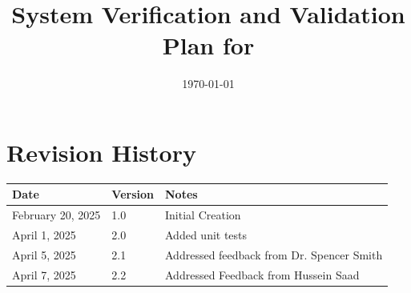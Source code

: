 \documentclass[12pt, titlepage]{article}
\begin{document}
\title{System Verification and Validation Plan for \progname{}} 
\author{\authname}
\date{\today}
	
\maketitle


\section*{Revision History}

\begin{tabularx}{\textwidth}{p{4cm}p{2cm}X}
\toprule {\bf Date} & {\bf Version} & {\bf Notes}\\
\midrule
February 20, 2025 & 1.0 & Initial Creation\\
April 1, 2025 & 2.0 & Added unit tests\\
April 5, 2025 & 2.1 & Addressed feedback from Dr. Spencer Smith\\
April 7, 2025 & 2.2 & Addressed Feedback from Hussein Saad\\
\bottomrule
\end{tabularx}



\newpage

\tableofcontents

\listoftables

\end{document}
